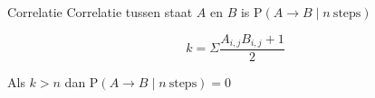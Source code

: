 \documentclass{article}
\begin{document}
	\begin{section}{Correlatie}
		Correlatie tussen staat $A$ en $B$ is $ \mathrm{P}(A \rightarrow B \mid n\ \mathrm{steps}) $

		$$ k = \Sigma \frac{A_{i, j} B_{i, j} + 1}{2} $$

		Als $ k > n $ dan $ \mathrm{P}(A \rightarrow B \mid n\ \mathrm{steps}) = 0 $
	\end{section}
\end{document}
